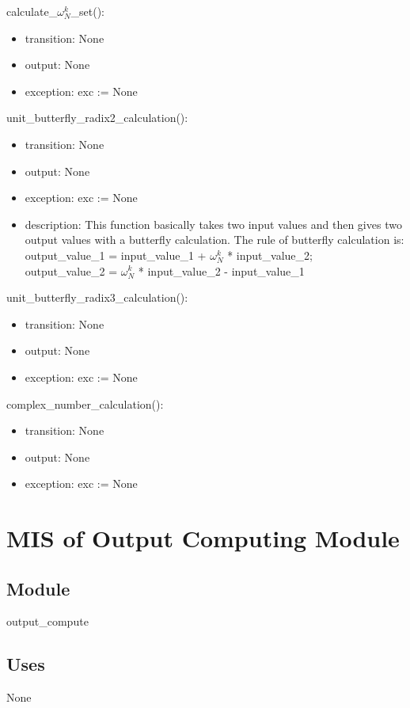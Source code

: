 \documentclass[12pt, titlepage]{article}
\begin{document}
calculate\_$\omega _{N}^{k}$\_set():
\begin{itemize}
\item transition: None
\item output:  None
\item exception: exc := None

\end{itemize}
unit\_butterfly\_radix2\_calculation():
\begin{itemize}
\item transition: None
\item output:  None
\item exception: exc := None
\item description: This function basically takes two input values and then gives two output values with a butterfly calculation. The rule of butterfly calculation is: 
\\output\_value\_1 = input\_value\_1 + $\omega_{N}^{k}$ * input\_value\_2;  
\\output\_value\_2 = $\omega_{N}^{k}$ * input\_value\_2 -  input\_value\_1 
\end{itemize}
unit\_butterfly\_radix3\_calculation():
\begin{itemize}
\item transition: None
\item output:  None
\item exception: exc := None
\end{itemize}
complex\_number\_calculation():
\begin{itemize}
\item transition: None
\item output:  None
\item exception: exc := None
\end{itemize}

\section{MIS of Output Computing Module} \label{Input} 

\subsection{Module}

output\_compute

\subsection{Uses}
None
\end{document}
